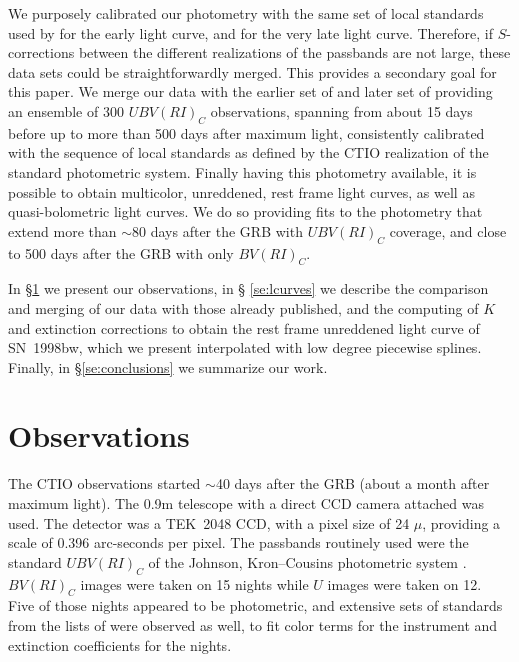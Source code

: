 \documentclass[12pt,preprint]{aastex}
\begin{document}
We purposely calibrated our photometry with the same set of local standards
used by \citet{getal98} for the early light curve, and \citet{soetal02} for
the very late light curve.
%
Therefore, if $S$-corrections \citep{petal04} between the different realizations of the
passbands are not large, these data sets could be straightforwardly merged.
%
This provides a secondary goal for this paper.
%
We merge our data with the earlier set of \citet{getal98} and later set of
\citet{soetal02} providing an ensemble of 300 $UBV(RI)_C$ observations, spanning from about
15 days before up to more than 500 days after maximum light, consistently calibrated with the
sequence of local standards as defined by the CTIO realization of the standard photometric system.
%
Finally having this photometry available, it is possible to obtain
multicolor, unreddened, rest frame light curves, as well as quasi-bolometric light curves.
%
We do so providing fits to the photometry that extend more than
$\sim$80 days after the GRB with $UBV(RI)_C$ coverage, and close to 500 days
after the GRB with only $BV(RI)_C$.

In \S \ref{se:observations} we present our observations, in \S
\ref{se:lcurves} we describe the comparison and merging of our data with those already published,
and the computing of $K$ and extinction corrections to obtain the rest frame unreddened light
curve of SN~1998bw, which we present interpolated with low degree piecewise splines.
%
Finally, in \S \ref{se:conclusions} we summarize our work.

\section{Observations} \label{se:observations}

The CTIO observations started $\sim$40 days after the GRB (about a month after maximum light).
%
The 0.9m telescope with a direct CCD camera attached was used.
%
The detector was a TEK~2048 CCD, with a pixel size of 24 $\mu$, providing
a scale of 0.396 arc-seconds per pixel.
%
The passbands routinely used were the standard $UBV(RI)_C$ of the Johnson, Kron--Cousins photometric
system \citep{kronsmith51, johnson55, cousins76}.
%
$BV(RI)_C$ images were taken on 15 nights while $U$ images were taken on 12.
%
Five of those nights appeared to be photometric, and extensive sets of standards from the lists of
\citet{landolt92} were observed as well, to fit color terms for the instrument and extinction
coefficients for the nights.
\end{document}
